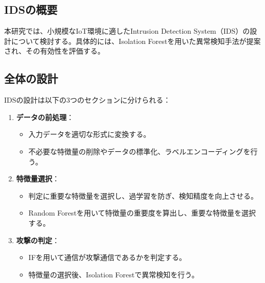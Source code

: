 \documentclass{css}
\begin{document}
\subsection{IDSの概要}
本研究では、小規模なIoT環境に適したIntrusion Detection System（IDS）の設計について検討する。具体的には、Isolation Forestを用いた異常検知手法が提案され、その有効性を評価する。

\subsection{全体の設計}
IDSの設計は以下の3つのセクションに分けられる：
\begin{enumerate}
    \item \textbf{データの前処理}：
        \begin{itemize}
            \item 入力データを適切な形式に変換する。
            \item 不必要な特徴量の削除やデータの標準化、ラベルエンコーディングを行う。
        \end{itemize}
    \item \textbf{特徴量選択}：
        \begin{itemize}
            \item 判定に重要な特徴量を選択し、過学習を防ぎ、検知精度を向上させる。
            \item Random Forestを用いて特徴量の重要度を算出し、重要な特徴量を選択する。
        \end{itemize}
    \item \textbf{攻撃の判定}：
        \begin{itemize}
            \item IFを用いて通信が攻撃通信であるかを判定する。
            \item 特徴量の選択後、Isolation Forestで異常検知を行う。
        \end{itemize}
\end{enumerate}
\end{document}
